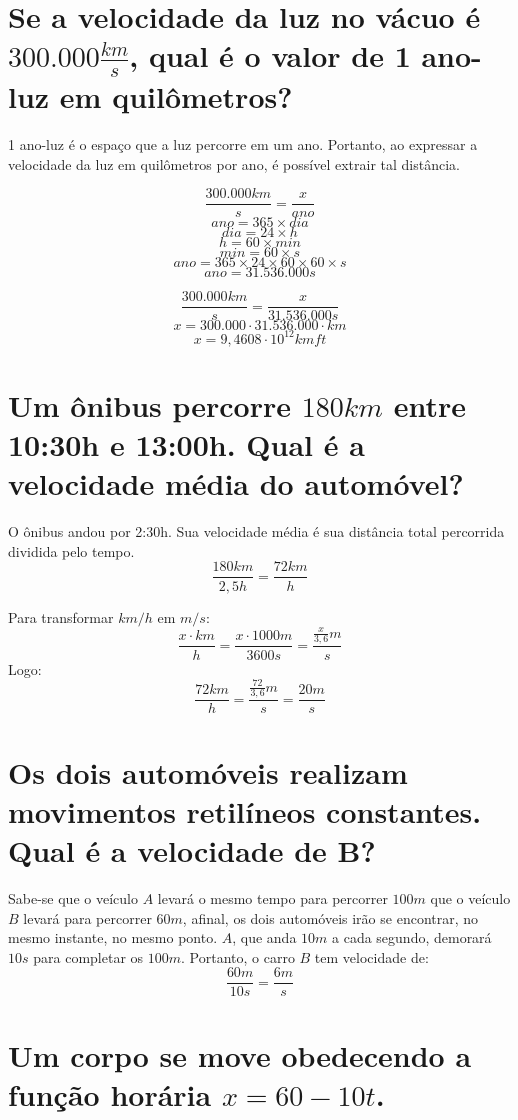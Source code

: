 \documentclass[a4paper]{article}
\begin{document}
\section{Se a velocidade da luz no vácuo é \(300.000\frac{km}{s}\), qual é o valor de 1 ano-luz em quilômetros?}
\hspace{\parindent}1 ano-luz é o espaço que a luz percorre em um ano. Portanto, ao expressar a velocidade da luz em quilômetros por ano, é possível extrair tal distância.

\[\frac{300.000km}{s}=\frac{x}{ano}\]
\[ano=365\times dia\]
\[dia = 24\times h\]
\[h=60\times min\]
\[min = 60\times s\]
\[ano=365\times 24\times 60\times 60\times s\]
\[ano = 31.536.000s\]

\[\frac{300.000km}{s}=\frac{x}{31.536.000s}\]
\[x = 300.000\cdot 31.536.000\cdot km\]
\[x=9,4608\cdot 10^{12} km ft\]

\section{Um ônibus percorre \(180km\) entre 10:30h e 13:00h. Qual é a velocidade média do automóvel?}

\hspace{\parindent}O ônibus andou por 2:30h. Sua velocidade média é sua distância total percorrida dividida pelo tempo.
\[\frac{180km}{2,5h}=\frac{72km}{h}\]
\par Para transformar \(km/h\) em \(m/s\):
\[\frac{x\cdot km}{h} = \frac{x\cdot 1000m}{3600s} = \frac{\frac{x}{3,6}m}{s}\]
\hspace{\parindent}Logo:
\[\frac{72km}{h}=\frac{\frac{72}{3,6}m}{s}=\frac{20m}{s}\]

\section{Os dois automóveis realizam movimentos retilíneos constantes. Qual é a velocidade de B?}

\hspace{\parindent}Sabe-se que o veículo \(A\) levará o mesmo tempo para percorrer \(100m\) que o veículo \(B\) levará para percorrer \(60m\), afinal, os dois automóveis irão se encontrar, no mesmo instante, no mesmo ponto. \(A\), que anda \(10m\) a cada segundo, demorará \(10s\) para completar os \(100m\). Portanto, o carro \(B\) tem velocidade de: \[\frac{60m}{10s} = \frac{6m}{s}\] 
\section{Um corpo se move obedecendo a função horária \(x = 60 - 10t\).}
\end{document}
